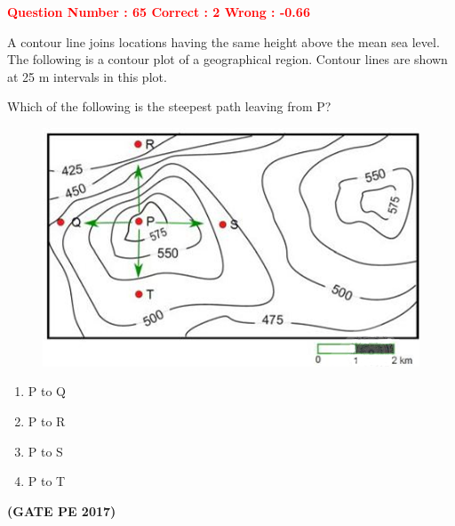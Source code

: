 \documentclass[journal,12pt,onecolumn]{article}
\begin{document}
{\textcolor{red}{\textbf{Question Number : 65 \hfill Correct : 2  Wrong : -0.66}}



A contour line joins locations having the same height above the mean sea level. The following is a contour plot of a geographical region. Contour lines are shown at 25 m intervals in this plot.

Which of the following is the steepest path leaving from P?

\begin{figure}[hbtp!]
    \centering
    \includegraphics[width=0.7\linewidth]{Figs/Graph_Q65.png}
\end{figure}

\begin{enumerate}[label=(\Alph*)]
    \item P to Q
    \item P to R
    \item P to S
    \item P to T
\end{enumerate}

\hfill\textbf{(GATE PE 2017)}\\[0.6cm]

}

\newpage

\renewcommand{\arraystretch}{1.3}


\end{document}
